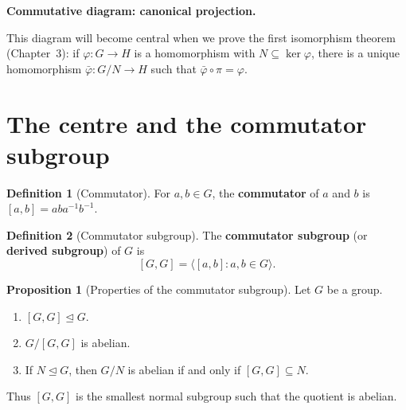 \documentclass[12pt,a4paper,openany]{book}
\theoremstyle{definition}
\newtheorem{definition}{Definition}[chapter]
\newtheorem{proposition}{Proposition}[chapter]
\theoremstyle{remark}
\begin{document}
\medskip
\noindent\textbf{Commutative diagram: canonical projection.}

\begin{center}
\end{center}

\noindent This diagram will become central when we prove the first
isomorphism theorem (Chapter~3): if $\varphi\colon G\to H$ is a
homomorphism with $N\subseteq\ker\varphi$, there is a unique homomorphism
$\bar\varphi\colon G/N\to H$ such that $\bar\varphi\circ\pi=\varphi$.

\section{The centre and the commutator subgroup}
\label{sec:ch2-centre-commutator}

\begin{definition}[Commutator]
\label{def:commutator}
For $a,b\in G$, the \textbf{commutator} of $a$ and $b$ is
$[a,b]=aba^{-1}b^{-1}$.
\end{definition}

\begin{definition}[Commutator subgroup]
\label{def:commutator-subgroup}
The \textbf{commutator subgroup} (or \textbf{derived subgroup}) of $G$ is
\[
  [G,G] = \langle [a,b] : a,b\in G\rangle.
\]
\end{definition}

\begin{proposition}[Properties of the commutator subgroup]
\label{prop:commutator-properties}
Let $G$ be a group.
\begin{enumerate}[label=(\roman*)]
  \item $[G,G]\trianglelefteq G$.
  \item $G/[G,G]$ is abelian.
  \item If $N\trianglelefteq G$, then $G/N$ is abelian if and only if
    $[G,G]\subseteq N$.
\end{enumerate}
Thus $[G,G]$ is the smallest normal subgroup such that the quotient is
abelian.
\end{proposition}
\end{document}
